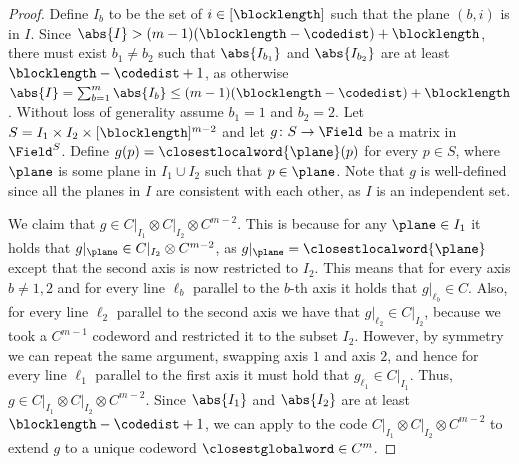 \documentclass{toc}
\theoremstyle{plain}
\begin{document}
\begin{proof}
Define $I_b$ to be the set of $i \in [\blocklength]$ such that the plane $(b,i)$ is in $I$. Since $\abs{I} > (m-1)(\blocklength-\codedist) + \blocklength$, there must exist $b_1 \ne b_2$ such that $\abs{I_{b_1}}$ and $\abs{I_{b_2}}$ are at least $\blocklength - \codedist + 1$, as otherwise $\abs{I} = \sum_{b= 1}^m \abs{I_b} \leq (m-1)(\blocklength - \codedist) + \blocklength$. Without loss of generality assume $b_1 = 1$ and $b_2 = 2$. Let $S = I_1 \times I_2 \times [\blocklength]^{m-2}$ and let $g \colon S \to \Field$ be a matrix in $\Field^{S}$. Define $g(p) = \closestlocalword{\plane}(p)$ for every $p \in S$, where $\plane$ is some plane in $I_1 \cup I_2$ such that $p \in \plane$. Note that $g$ is well-defined since all the planes in $I$ are consistent with each other, as $I$ is an independent set.

We claim that $g \in C \vert_{I_1} \otimes C \vert_{I_2} \otimes C^{m-2}$. This is because for any $\plane \in I_1$ it holds that $g \vert_{\plane} \in C \vert_{I_2} \otimes C^{m-2}$, as $g \vert_{\plane} = \closestlocalword{\plane}$ except that the second axis is now restricted to $I_2$.
This means that for every axis $b \ne 1,2$ and for every line $\ell_b$ parallel to the $b$-th axis it holds that $g \vert_{\ell_b} \in C$.
Also, for every line $\ell_2$ parallel to the second axis we have that $g \vert_{\ell_2} \in C \vert_{I_2}$, because we took a $C^{m-1}$ codeword and restricted it to the subset $I_2$.
However, by symmetry we can repeat the same argument, swapping axis $1$ and axis $2$, and hence for every line $\ell_1$ parallel to the first axis it must hold that $g_{\ell_1} \in C \vert_{I_1}$.
Thus, $g \in C \vert_{I_1} \otimes C \vert_{I_2} \otimes C^{m-2}$. Since $\abs{I_1}$ and $\abs{I_2}$ are at least $\blocklength - \codedist + 1$, we can apply  to the code $C \vert_{I_1} \otimes C \vert_{I_2} \otimes C^{m-2}$ to extend $g$ to a unique codeword $\closestglobalword \in C^m$.



\end{proof}
\end{document}

